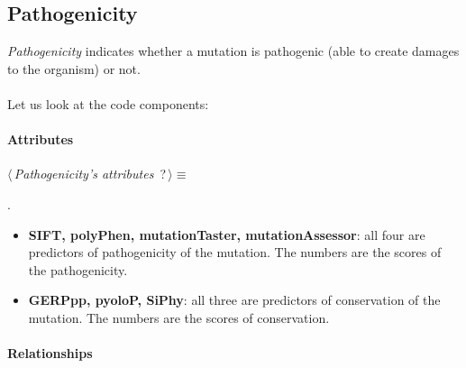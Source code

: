 \subsection{Pathogenicity}
\emph{Pathogenicity} indicates whether a mutation is pathogenic (able to create damages to the organism) or not.
\\
\\Let us look at the code components:

\paragraph{Attributes}      

	\begin{flushleft} \small
\begin{minipage}{\linewidth}\label{scrap8}\raggedright\small
{} $\langle\,${\itshape {Pathogenicity's attributes}}\nobreak\ {\footnotesize {?}}$\,\rangle\equiv$
\vspace{-1ex}
\begin{list}{}{} \item

                
        {\NWsep}
\end{list}
\vspace{-1.5ex}
\footnotesize
\begin{list}{}{\setlength{\itemsep}{-\parsep}\setlength{\itemindent}{-\leftmargin}}
\item {\NWtxtMacroNoRef}.

\item{}
\end{list}
\end{minipage}\vspace{4ex}
\end{flushleft}
\begin{itemize}
 	\item \textbf{SIFT, polyPhen, mutationTaster, mutationAssessor}: all four are predictors of pathogenicity of the mutation. The numbers are the scores of the pathogenicity.
 	\item \textbf{GERPpp, pyoloP, SiPhy}: all three are predictors of conservation of the mutation. The numbers are the scores of conservation.
\end{itemize}

\paragraph{Relationships} 

